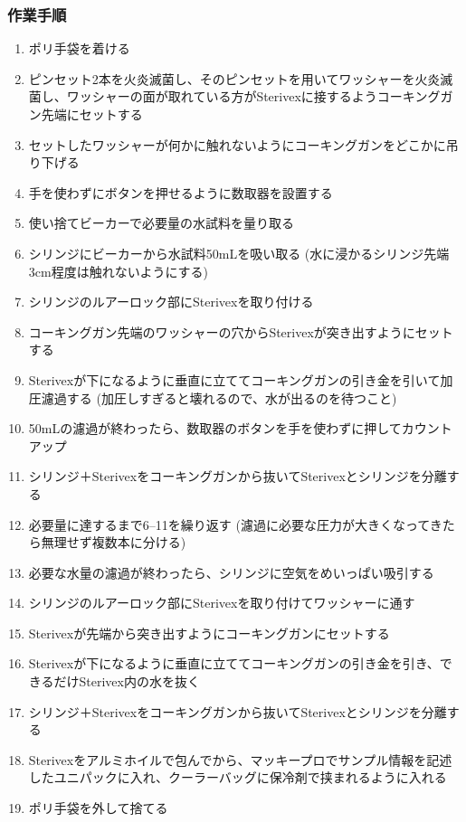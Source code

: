 \documentclass[titlepage,10pt,a4paper,uplatex]{jsbook}
\begin{document}
\subsubsection{作業手順}
\begin{enumerate}
\item ポリ手袋を着ける
\item ピンセット2本を火炎滅菌し、そのピンセットを用いてワッシャーを火炎滅菌し、ワッシャーの面が取れている方がSterivexに接するようコーキングガン先端にセットする
\item セットしたワッシャーが何かに触れないようにコーキングガンをどこかに吊り下げる
\item 手を使わずにボタンを押せるように数取器を設置する
\item 使い捨てビーカーで必要量の水試料を量り取る
\item シリンジにビーカーから水試料50mLを吸い取る (水に浸かるシリンジ先端3cm程度は触れないようにする)
\item シリンジのルアーロック部にSterivexを取り付ける
\item コーキングガン先端のワッシャーの穴からSterivexが突き出すようにセットする
\item Sterivexが下になるように垂直に立ててコーキングガンの引き金を引いて加圧濾過する (加圧しすぎると壊れるので、水が出るのを待つこと)
\item 50mLの濾過が終わったら、数取器のボタンを手を使わずに押してカウントアップ
\item シリンジ＋Sterivexをコーキングガンから抜いてSterivexとシリンジを分離する
\item 必要量に達するまで6--11を繰り返す (濾過に必要な圧力が大きくなってきたら無理せず複数本に分ける)
\item 必要な水量の濾過が終わったら、シリンジに空気をめいっぱい吸引する
\item シリンジのルアーロック部にSterivexを取り付けてワッシャーに通す
\item Sterivexが先端から突き出すようにコーキングガンにセットする
\item Sterivexが下になるように垂直に立ててコーキングガンの引き金を引き、できるだけSterivex内の水を抜く
\item シリンジ＋Sterivexをコーキングガンから抜いてSterivexとシリンジを分離する
\item Sterivexをアルミホイルで包んでから、マッキープロでサンプル情報を記述したユニパックに入れ、クーラーバッグに保冷剤で挟まれるように入れる
\item ポリ手袋を外して捨てる
\end{enumerate}
\end{document}
